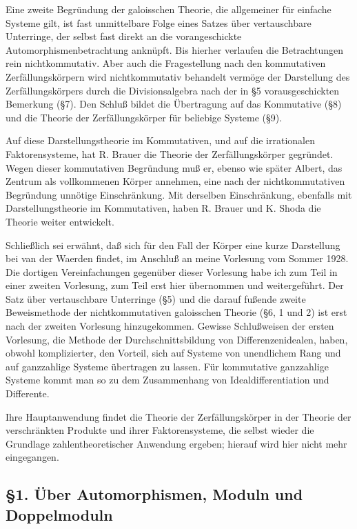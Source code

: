 \documentclass[11pt]{article}
\begin{document}
Eine zweite Begründung der galoisschen Theorie, die allgemeiner für einfache Systeme gilt, ist fast unmittelbare Folge eines Satzes über vertauschbare Unterringe, der selbst fast direkt an die vorangeschickte Automorphismenbetrachtung anknüpft. Bis hierher verlaufen die Betrachtungen rein nichtkommutativ. Aber auch die Fragestellung nach den kommutativen Zerfällungskörpern wird nichtkommutativ behandelt vermöge der Darstellung des Zerfällungskörpers durch die Divisionsalgebra nach der in §5 vorausgeschickten Bemerkung (§7). Den Schluß bildet die Übertragung auf das Kommutative (§8) und die Theorie der Zerfällungskörper für beliebige Systeme (§9).

Auf diese Darstellungstheorie im Kommutativen, und auf die irrationalen Faktorensysteme, hat R. Brauer die Theorie der Zerfällungskörper gegründet. Wegen dieser kommutativen Begründung muß er, ebenso wie später Albert, das Zentrum als vollkommenen Körper annehmen, eine nach der nichtkommutativen Begründung unnötige Einschränkung. Mit derselben Einschränkung, ebenfalls mit Darstellungstheorie im Kommutativen, haben R. Brauer und K. Shoda die Theorie weiter entwickelt.

Schließlich sei erwähnt, daß sich für den Fall der Körper eine kurze Darstellung bei van der Waerden findet, im Anschluß an meine Vorlesung vom Sommer 1928. Die dortigen Vereinfachungen gegenüber dieser Vorlesung habe ich zum Teil in einer zweiten Vorlesung, zum Teil erst hier übernommen und weitergeführt. Der Satz über vertauschbare Unterringe (§5) und die darauf fußende zweite Beweismethode der nichtkommutativen galoisschen Theorie (§6, 1 und 2) ist erst nach der zweiten Vorlesung hinzugekommen. Gewisse Schlußweisen der ersten Vorlesung, die Methode der Durchschnittsbildung von Differenzenidealen, haben, obwohl komplizierter, den Vorteil, sich auf Systeme von unendlichem Rang und auf ganzzahlige Systeme übertragen zu lassen. Für kommutative ganzzahlige Systeme kommt man so zu dem Zusammenhang von Idealdifferentiation und Differente.

Ihre Hauptanwendung findet die Theorie der Zerfällungskörper in der Theorie der verschränkten Produkte und ihrer Faktorensysteme, die selbst wieder die Grundlage zahlentheoretischer Anwendung ergeben; hierauf wird hier nicht mehr eingegangen.

\subsection*{§1. Über Automorphismen, Moduln und Doppelmoduln}
\end{document}
